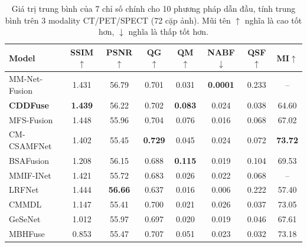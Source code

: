 \begin{table}[h]
\centering
\small
\caption{Giá trị trung bình của 7 chỉ số chính cho 10 phương pháp dẫn đầu, tính trung bình trên 3 modality CT/PET/SPECT (72 cặp ảnh). Mũi tên $\uparrow$ nghĩa là cao tốt hơn, $\downarrow$ nghĩa là thấp tốt hơn.}
\label{tab:sota-raw-metrics}
\setlength{\tabcolsep}{4pt}
\begin{tabular}{lccccccc}
\toprule
\textbf{Model} & \textbf{SSIM}$\uparrow$ & \textbf{PSNR}$\uparrow$ & \textbf{QG}$\uparrow$ & \textbf{QM}$\uparrow$ & \textbf{NABF}$\downarrow$ & \textbf{QSF}$\uparrow$ & \textbf{MI}$\uparrow$ \\
\midrule
MM-Net-Fusion    & 1.431 & 56.79 & 0.701 & 0.031 & \textbf{0.0001} & 0.233 & --     \\
\textbf{CDDFuse} & \textbf{1.439} & 56.22 & 0.702 & \textbf{0.083} & 0.024  & 0.038 & 64.60 \\
MFS-Fusion       & 1.448 & 55.96 & 0.704 & 0.076 & 0.016  & 0.068 & 67.02 \\
CM-CSAMFNet      & 1.402 & 55.45 & \textbf{0.729} & 0.045 & 0.024  & 0.072 & \textbf{73.72} \\
BSAFusion        & 1.208 & 56.15 & 0.688 & \textbf{0.115} & 0.019  & 0.104 & 69.53 \\
MMIF-INet        & 1.421 & 55.72 & 0.683 & 0.026 & 0.022  & 0.068 & --     \\
LRFNet           & 1.444 & \textbf{56.66} & 0.637 & 0.016 & 0.006  & 0.222 & 57.40 \\
CMMDL            & 1.147 & 55.41 & 0.700 & 0.021 & 0.026  & 0.037 & 73.05 \\
GeSeNet          & 1.012 & 55.97 & 0.697 & 0.020 & 0.019  & 0.046 & 67.61 \\
MBHFuse          & 0.853 & 55.47 & 0.707 & 0.051 & 0.023  & 0.032 & 73.18 \\
\bottomrule
\end{tabular}
\end{table}

